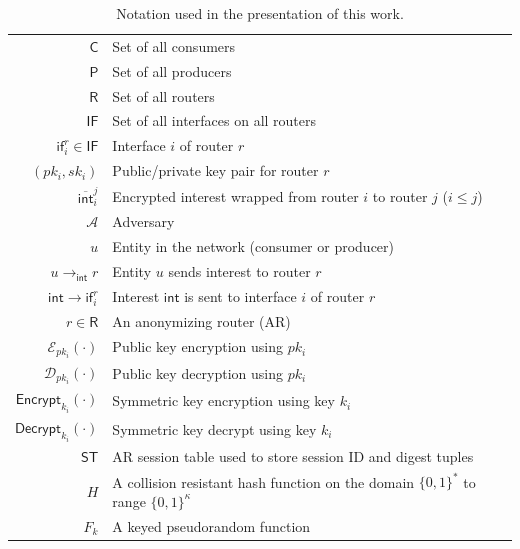 \documentclass[10pt]{article}
\begin{document}
\begin{table}
\centering
\caption{Notation used in the presentation of this work.}
\label{tab:notation}
  \begin{tabular}{| r | l |} \hline
  $\mathsf{C}$ & Set of all consumers  \\
  $\mathsf{P}$ & Set of all producers  \\ 
  $\mathsf{R}$ & Set of all routers  \\
  $\mathsf{IF}$ & Set of all interfaces on all routers  \\
  $\mathsf{if}_i^r \in \mathsf{IF}$ & Interface $i$ of router $r$  \\
  $(pk_i, sk_i)$ & Public/private key pair for router $r$  \\
  $\overline{\mathsf{int}}_{i}^{j}$ & Encrypted interest wrapped from router $i$ to router $j$ ($i \leq j$)  \\
  $\mathcal{A}$ & Adversary \\ 
  $u$ & Entity in the network (consumer or producer) \\
  $u \to_{\mathsf{int}} r$ & Entity $u$ sends interest to router $r$  \\ 
  $\mathsf{int} \to \mathsf{if}_i^r$ & Interest $\mathsf{int}$ is sent to interface $i$ of router $r$ \\
  $r \in \mathsf{R}$ & An anonymizing router (AR) \\ 
  $\mathcal{E}_{pk_i}(\cdot)$ & Public key encryption using $pk_i$ \\ 
  $\mathcal{D}_{pk_i}(\cdot)$ & Public key decryption using $pk_i$ \\ 
  $\mathsf{Encrypt}_{k_i}(\cdot)$ & Symmetric key encryption using key $k_i$ \\ 
  $\mathsf{Decrypt}_{k_i}(\cdot)$ & Symmetric key decrypt using key $k_i$ \\ 
  $\mathsf{ST}$ & AR session table used to store session ID and digest tuples \\
  $H$ & A collision resistant hash function on the domain $\{0,1\}^*$ to range $\{0,1\}^{\kappa}$ \\
  $F_k$ & A keyed pseudorandom function \\ \hline
  \end{tabular}
\end{table}
\end{document}
